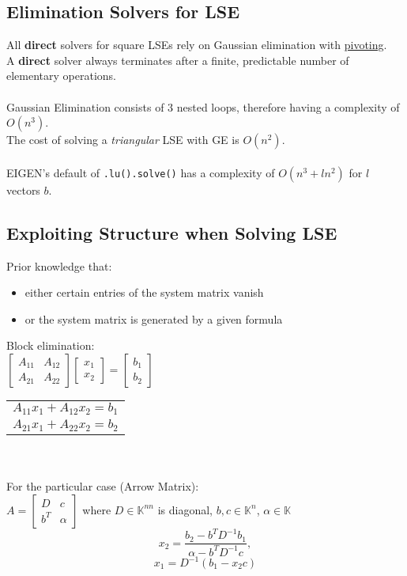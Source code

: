 \documentclass[12pt]{article}
\begin{document}
\subsection{Elimination Solvers for LSE}
All \textbf{direct} solvers for square LSEs rely on Gaussian elimination with \underline{pivoting}.\\
A \textbf{direct} solver always terminates after a finite, predictable number of elementary operations.\\\\
Gaussian Elimination consists of 3 nested loops, therefore having a complexity of $O(n^3)$.\\
The cost of solving a \textit{triangular} LSE with GE is $O(n^2)$.\\\\
EIGEN's default of \texttt{.lu().solve()} has a complexity of $O(n^3 + ln^2)$ for $l$ vectors $b$.
\subsection{Exploiting Structure when Solving LSE}
Prior knowledge that:
\begin{itemize}
\item either certain entries of the system matrix vanish
\item or the system matrix is generated by a given formula
\end{itemize}
Block elimination:\\
$\begin{bmatrix}A_{11} & A_{12} \\ A_{21} & A_{22}\end{bmatrix} \begin{bmatrix}x_1 \\ x_2\end{bmatrix} = \begin{bmatrix}b_1 \\ b_2\end{bmatrix}$ \hspace*{1cm} \begin{tabular}{l}$A_{11}x_1 + A_{12}x_2 = b_1$ \\ $A_{21}x_1 + A_{22}x_2 = b_2$ \end{tabular}\\\\
For the particular case (Arrow Matrix):\\
$A = \begin{bmatrix}D & c \\ b^T & \alpha \end{bmatrix}$ where $D \in \mathbb{K}^{nn}$ is diagonal, $b, c \in \mathbb{K}^n$, $\alpha \in \mathbb{K}$\\
$$x_2 = \frac{b_2 - b^TD^{-1}b_1}{\alpha-b^TD^{-1}c},$$
$$x_1 = D^{-1}(b_1-x_2c)$$
\end{document}
